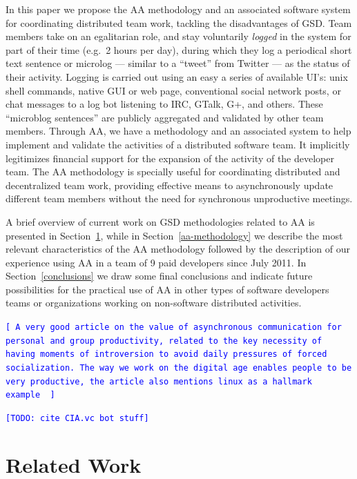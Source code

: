 \documentclass[letterpaper]{article}
\newcommand{\indraftnote}[1]{\textcolor{blue}{\texttt{\footnotesize[#1]}}}
\newcommand{\todo}[1]{\indraftnote{todo: #1}}
\begin{document}
In this paper we propose the AA methodology and an associated software system
for coordinating distributed team work, tackling the disadvantages
of GSD. Team members take on an egalitarian role, and stay
voluntarily \textit{logged} in the system for part of their time
(e.g.\ 2 hours per day), during which they log a periodical short text
sentence or microlog --- similar to a ``tweet'' from Twitter --- as the
status of their activity. Logging is carried out using an easy a series of
available UI's: unix shell
commands, native GUI or web page, conventional social network posts, or chat messages to a log bot
listening to IRC, GTalk, G+, and others.  These ``microblog sentences'' are publicly aggregated and validated by other
team members. Through AA, we have a methodology and an associated system to help
implement and validate the activities of a distributed software team. It implicitly
legitimizes financial support for the expansion of the activity of the developer
team. The AA methodology is specially useful for coordinating distributed and
decentralized team work, providing effective means to asynchronously update
different team members without the need for synchronous unproductive meetings.


A brief overview of current work on GSD methodologies related to
AA is presented in Section~\ref{related-work}, while in
Section~\ref{aa-methodology} we describe the most relevant
characteristics of the AA methodology followed by the description of
our experience using AA in a team of 9 paid developers 
since July 2011. In Section~\ref{conclusions} we draw some final
conclusions and indicate future possibilities for the
practical use of AA in other types of software developers teams or
organizations working on non-software distributed activities.

\indraftnote{
A very good article on the value of asynchronous communication for personal
and group productivity, related to the key necessity of having moments of
introversion to avoid daily pressures of forced socialization. The way we work
on the digital age enables people to be very productive, the article also
mentions linux as a hallmark example~\cite{Thompson:Wired:2012}
}

\indraftnote{TODO: cite CIA.vc bot stuff}

\section{Related Work}
\label{related-work}
\end{document}
